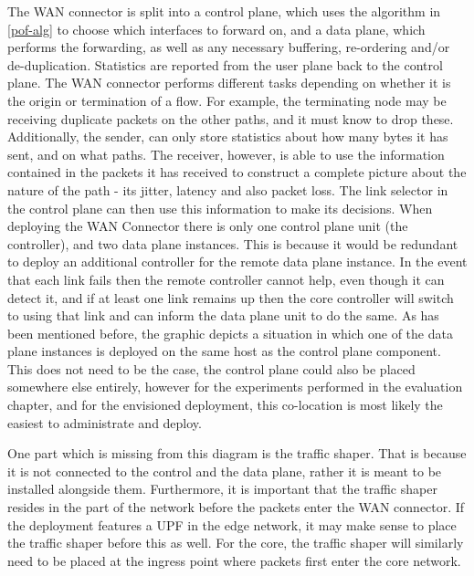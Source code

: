 The WAN connector is split into a control plane, which uses the algorithm in \ref{pof-alg} to choose which interfaces to forward on, and a data plane, which performs the forwarding, as well as any necessary buffering, re-ordering and/or de-duplication. Statistics are reported from the user plane back to the control plane. The WAN connector performs different tasks depending on whether it is the origin or termination of a flow. For example, the terminating node may be receiving duplicate packets on the other paths, and it must know to drop these. Additionally, the sender, can only store statistics about how many bytes it has sent, and on what paths. The receiver, however, is able to use the information contained in the packets it has received to construct a complete picture about the nature of the path - its jitter, latency and also packet loss. The link selector in the control plane can then use this information to make its decisions. When deploying the WAN Connector there is only one control plane unit (the controller), and two data plane instances. This is because it would be redundant to deploy an additional controller for the remote data plane instance. In the event that each link fails then the remote controller cannot help, even though it can detect it, and if at least one link remains up then the core controller will switch to using that link and can inform the data plane unit to do the same. As has been mentioned before, the graphic depicts a situation in which one of the data plane instances is deployed on the same host as the control plane component. This does not need to be the case, the control plane could also be placed somewhere else entirely, however for the experiments performed in the evaluation chapter, and for the envisioned deployment, this co-location is most likely the easiest to administrate and deploy.

One part which is missing from this diagram is the traffic shaper. That is because it is not connected to the control and the data plane, rather it is meant to be installed alongside them. Furthermore, it is important that the traffic shaper resides in the part of the network before the packets enter the WAN connector. If the deployment features a UPF in the edge network, it may make sense to place the traffic shaper before this as well. For the core, the traffic shaper will similarly need to be placed at the ingress point where packets first enter the core network.



\cleardoublepage
